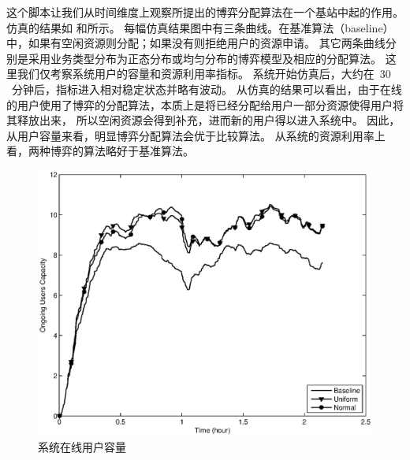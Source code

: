 这个脚本让我们从时间维度上观察所提出的博弈分配算法在一个基站中起的作用。
仿真的结果如  和所示。
每幅仿真结果图中有三条曲线。在基准算法（baseline）中，如果有空闲资源则分配；如果没有则拒绝用户的资源申请。
其它两条曲线分别是采用业务类型分布为正态分布或均匀分布的博弈模型及相应的分配算法。
这里我们仅考察系统用户的容量和资源利用率指标。
系统开始仿真后，大约在~$30$~分钟后，指标进入相对稳定状态并略有波动。
从仿真的结果可以看出，由于在线的用户使用了博弈的分配算法，本质上是将已经分配给用户一部分资源使得用户将其释放出来，
所以空闲资源会得到补充，进而新的用户得以进入系统中。
因此，从用户容量来看，明显博弈分配算法会优于比较算法。
从系统的资源利用率上看，两种博弈的算法略好于基准算法。
\begin{figure}[!tb] 
   \centering
  \begin{minipage}[t]{0.7\linewidth} 
    \centering 
    \includegraphics[width=\textwidth]{bayesian_time_vs_ongoing_user_number.eps} 
    \caption{系统在线用户容量} 
    \label{fig:chap_bayesian:time_vs_ongoing_user_number} 
  \end{minipage} 


\end{figure}
